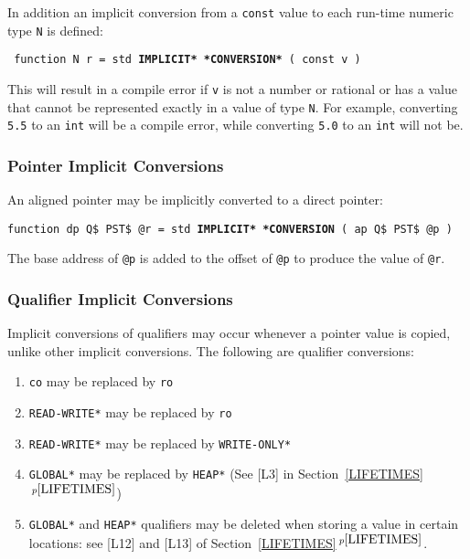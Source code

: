 \documentclass[12pt]{article}
\newcommand{\ttkey}[1]{{\tt \bfseries #1}}
\newcommand{\itemref}[1]{\ref{#1}$\,^{p\pageref{#1}}$}
\newenvironment{indpar}[1][0.3in]%
	{\begin{list}{}%
		     {\setlength{\itemsep}{0in}%
		      \setlength{\topsep}{0in}%
		      \setlength{\parsep}{1ex}%
		      \setlength{\labelwidth}{#1}%
		      \setlength{\leftmargin}{#1}%
		      \addtolength{\leftmargin}{\labelsep}}%
	 \item}%
	{\end{list}}
\begin{document}
In addition an implicit conversion from a {\tt const} value
to each run-time numeric type {\tt N} is defined:
\begin{indpar} \tt
function N r = std \ttkey{*IMPLICIT* *CONVERSION*} ( const v )
\end{indpar}
This will result in a compile error if {\tt v} is not a number
or rational or has a value that cannot be represented
exactly in a value of type {\tt N}.
For example, converting {\tt 5.5} to an {\tt int} will be a compile
error, while converting {\tt 5.0} to an {\tt int} will not be.

\subsubsection{Pointer Implicit Conversions}
\label{POINTER-IMPLICIT-CONVERSIONS}

An aligned pointer may be implicitly converted to a direct pointer:

\begin{indpar}
{\tt function dp Q\$ PST\$ @r =
    std \ttkey{*IMPLICIT* *CONVERSION} ( ap Q\$ PST\$ @p )}
\begin{indpar}
The base address of {\tt @p} is added to the offset of {\tt @p} to
produce the value of {\tt @r}.
\end{indpar}
\end{indpar}

\subsubsection{Qualifier Implicit Conversions}
\label{QUALIFIER-IMPLICIT-CONVERSIONS}

Implicit conversions of qualifiers may occur whenever a pointer
value is copied, unlike other implicit conversions.
The following are qualifier conversions:
\begin{indpar}
\begin{enumerate}
\item {\tt co} may be replaced by {\tt ro}
\item {\tt *READ-WRITE*} may be replaced by {\tt ro}
\item {\tt *READ-WRITE*} may be replaced by {\tt *WRITE-ONLY*}
\item {\tt *GLOBAL*} may be replaced by {\tt *HEAP*} (See [L3] in
Section~\itemref{LIFETIMES})
\item {\tt *GLOBAL*} and {\tt *HEAP*} qualifiers may be deleted
when storing a value in certain locations: see [L12] and [L13]
of Section~\itemref{LIFETIMES}.

\end{enumerate}
\end{indpar}
\end{document}

